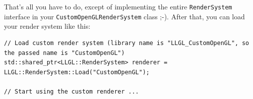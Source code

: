 \documentclass{article}
\begin{document}
That's all you have to do, except of implementing the entire \texttt{RenderSystem} interface
in your \texttt{CustomOpenGLRenderSystem} class ;-).
After that, you can load your render system like this:
\begin{lstlisting}
// Load custom render system (library name is "LLGL_CustomOpenGL", so the passed name is "CustomOpenGL")
std::shared_ptr<LLGL::RenderSystem> renderer = LLGL::RenderSystem::Load("CustomOpenGL");

// Start using the custom renderer ...
\end{lstlisting}





\end{document}
